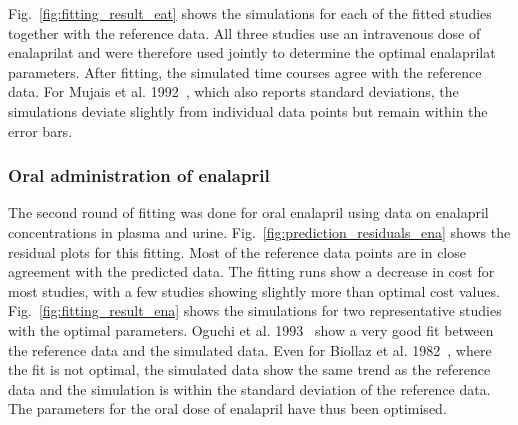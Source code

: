 Fig.~\ref{fig:fitting_result_eat} shows the simulations for each of the fitted studies together with the reference data. All three studies use an intravenous dose of enalaprilat and were therefore used jointly to determine the optimal enalaprilat parameters. After fitting, the simulated time courses agree with the reference data. For Mujais et al. 1992~\cite{Mujais1992}, which also reports standard deviations, the simulations deviate slightly from individual data points but remain within the error bars.

\subsubsection{Oral administration of enalapril}


The second round of fitting was done for oral enalapril using data on enalapril concentrations in plasma and urine. Fig.~\ref{fig:prediction_residuals_ena} shows the residual plots for this fitting. Most of the reference data points are in close agreement with the predicted data. The fitting runs show a decrease in cost for most studies, with a few studies showing slightly more than optimal cost values. Fig.~\ref{fig:fitting_result_ena} shows the simulations for two representative studies with the optimal parameters. Oguchi et al. 1993~\cite{Oguchi1993} show a very good fit between the reference data and the simulated data. Even for Biollaz et al. 1982~\cite{Biollaz1982}, where the fit is not optimal, the simulated data show the same trend as the reference data and the simulation is within the standard deviation of the reference data. The parameters for the oral dose of enalapril have thus been optimised. 



